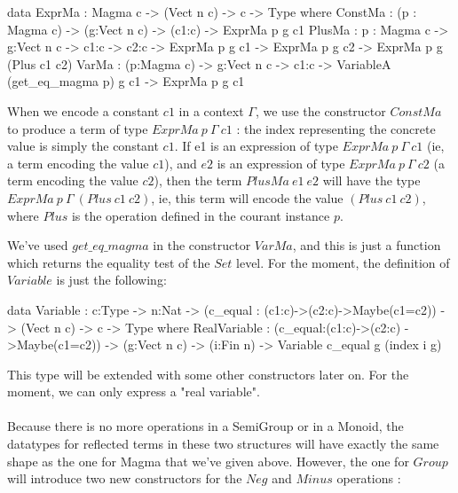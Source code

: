 \documentclass{sigplanconf}
\begin{document}
\begin{code}[caption=Reflected terms in a Magma, captionpos=b, label=lst1:haskell2]  
data ExprMa : Magma c -> (Vect n c) -> c -> 
              Type where
    ConstMa : (p : Magma c) -> (g:Vect n c) 
         -> (c1:c)  -> ExprMa p g c1 
    PlusMa : {p : Magma c} -> {g:Vect n c}
         -> {c1:c} -> {c2:c} 
         -> ExprMa p g c1 
         -> ExprMa p g c2 
         -> ExprMa p g (Plus c1 c2) 
    VarMa : (p:Magma c) -> {g:Vect n c}
         -> {c1:c} 
         -> VariableA (get_eq_magma p) g c1
         -> ExprMa p g c1
\end{code}	

When we encode a constant $c1$ in a context $\Gamma$, we use the constructor $ConstMa$ to produce a term of type $ExprMa\ p\ \Gamma\ c1$ : the index representing the concrete value is simply the constant $c1$.
If e1 is an expression of type $ExprMa\ p\ \Gamma\ c1$ (ie, a term encoding the value $c1$), and $e2$ is an expression of type $ExprMa\ p\ \Gamma\ c2$ (a term encoding the value $c2$), then the term $PlusMa\ e1\ e2$ will have the type $ExprMa\ p\ \Gamma\ (Plus\ c1\ c2)$, ie, this term will encode the value $(Plus\ c1\ c2)$, where $Plus$ is the operation defined in the courant instance $p$.


We've used $get\_eq\_magma$ in the constructor $VarMa$, and this is just a function which returns the equality test of the $Set$ level.
For the moment, the definition of $Variable$ is just the following:

\begin{code}[caption=Reflected variables, captionpos=b, label=lst1:haskell2]  
data Variable : {c:Type} -> {n:Nat}
  -> (c_equal : (c1:c)->(c2:c)->Maybe(c1=c2)) 
  -> (Vect n c) -> c -> Type where
    RealVariable : (c_equal:(c1:c)->(c2:c)
                    ->Maybe(c1=c2))
          -> (g:Vect n c) -> (i:Fin n) 
          -> Variable c_equal g (index i g) 
\end{code}	

This type will be extended with some other constructors later on. For the moment, we can only express a "real variable". \\
\\
Because there is no more operations in a SemiGroup or in a Monoid, the datatypes for reflected terms in these two structures will have exactly the same shape as the one for Magma that we've given above.
However, the one for $Group$ will introduce two new constructors for the $Neg$ and $Minus$ operations :
\end{document}

